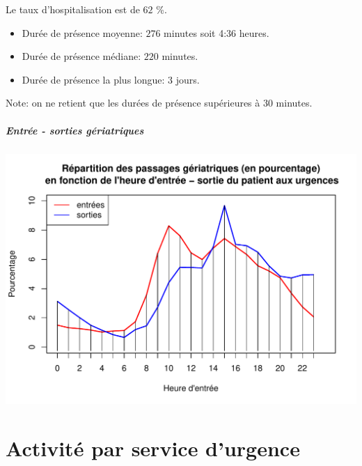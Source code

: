 \documentclass[12pt,english,french,twoside]{book}\usepackage[]{graphicx}\usepackage[]{color}
\makeatletter
\def\maxwidth{ %
  \ifdim\Gin@nat@width>\linewidth
    \linewidth
  \else
    \Gin@nat@width
  \fi
}
\newenvironment{knitrout}{}{} %
\makeatother
\begin{document}
Le taux d'hospitalisation est de $62$ \%.





\begin{itemize}
  \item Durée de présence moyenne: $276$ minutes soit 4:36 heures.
  \item Durée de présence médiane: $220$ minutes.
  \item Durée de présence la plus longue: $3$ jours.
\end{itemize}

Note: on ne retient que les durées de présence supérieures à 30 minutes.

\subsubsection*{Entrée - sorties gériatriques}

\begin{knitrout}
\color{fgcolor}
\includegraphics[width=\maxwidth]{figure/es_geriatriques} 

\end{knitrout}





\part{Activité par service d'urgence}
\label{partie4}
\end{document}
